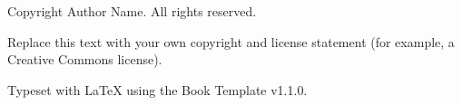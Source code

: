 \begin{widepage}
\thispagestyle{empty}
\null\vfill
\begingroup
\small
\noindent Copyright \textcopyright{} \the\year{} Author Name. All rights reserved.
\par\medskip
\noindent Replace this text with your own copyright and license statement
(for example, a Creative Commons license).
\par\medskip
\noindent Typeset with \LaTeX{} using the Book Template v1.1.0.
\endgroup
\end{widepage}
